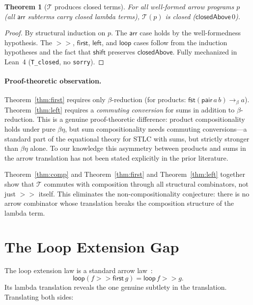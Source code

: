 \documentclass[11pt,a4paper]{article}
\newtheorem{theorem}{Theorem}
\theoremstyle{definition}
\theoremstyle{remark}
\newcommand{\comp}{\mathbin{>\!\!>}}
\newcommand{\first}{\mathsf{first}}
\newcommand{\leftc}{\mathsf{left}}
\newcommand{\loopop}{\mathsf{loop}}
\newcommand{\T}{\mathcal{T}}
\begin{document}
\begin{theorem}[$\T$ produces closed terms]\label{thm:tclosed}
For all well-formed arrow programs $p$ (all $\mathsf{arr}$ subterms
carry closed lambda terms), $\T(p)$ is closed ($\mathsf{closedAbove}\,0$).
\end{theorem}

\begin{proof}
By structural induction on $p$. The $\mathsf{arr}$ case holds by the
well-formedness hypothesis. The $\comp$, $\first$, $\leftc$, and
$\mathsf{loop}$ cases follow from the induction hypotheses and the
fact that $\mathsf{shift}$ preserves $\mathsf{closedAbove}$. Fully
mechanized in Lean~4 (\texttt{T\_closed}, no \texttt{sorry}).
\end{proof}

\paragraph{Proof-theoretic observation.}
Theorem~\ref{thm:first} requires only $\beta$-reduction (for products:
$\mathsf{fst}(\mathsf{pair}\,a\,b) \to_\beta a$). Theorem~\ref{thm:left}
requires a \emph{commuting conversion} for sums in addition to
$\beta$-reduction. This is a genuine proof-theoretic difference: product
compositionality holds under pure $\beta\eta$, but sum compositionality
needs commuting conversions---a standard part of the equational theory
for STLC with sums, but strictly stronger than $\beta\eta$ alone. To our
knowledge this asymmetry between products and sums in the arrow
translation has not been stated explicitly in the prior literature.

Theorem~\ref{thm:comp} and Theorem~\ref{thm:first} and Theorem~\ref{thm:left} together show that $\T$ commutes with
composition through all structural combinators, not just $\comp$ itself.
This eliminates the non-compositionality conjecture: there is no arrow
combinator whose translation breaks the composition structure of the
lambda term.

\section{The Loop Extension Gap}\label{sec:loop}

The loop extension law is a standard arrow law~\cite{hughes2000,lindley2008arrow}:
\begin{equation}\label{eq:loop-ext}
  \loopop(f \comp \first\,g) = \loopop\,f \comp g.
\end{equation}
Its lambda translation reveals the one genuine subtlety in the
translation. Translating both sides:
\end{document}
